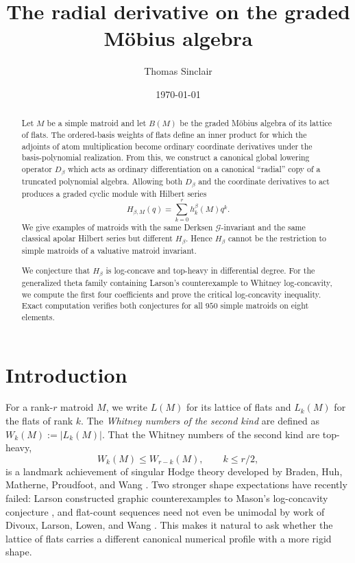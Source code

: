 \documentclass[11pt]{amsart}
\title[The radial derivative]{The radial derivative on the graded M\"obius algebra}
\author[T.~Sinclair]{Thomas Sinclair \orcidlink{0000-0003-0401-7232}}
\date{\today}
\theoremstyle{definition}
\theoremstyle{remark}
\begin{document}
\begin{abstract}
Let $M$ be a simple matroid and let $B(M)$ be the graded M\"obius algebra of its lattice of flats.  The ordered-basis weights of flats define an inner product for which the adjoints of atom multiplication become ordinary coordinate derivatives under the basis-polynomial realization. From this, we construct a canonical global lowering operator $D_\beta$ which acts as ordinary differentiation on a canonical ``radial'' copy of a truncated polynomial algebra.  Allowing both $D_\beta$ and the coordinate derivatives to act produces a graded cyclic module with Hilbert series
\[
H_{\beta,M}(q)=\sum_{k=0}^r h_k^\beta(M)q^k.
\]
We give examples of matroids with the same Derksen $\mathcal G$-invariant and the same classical apolar Hilbert series but different $H_\beta$.  Hence $H_\beta$ cannot be the restriction to simple matroids of a valuative matroid invariant.

We conjecture that $H_\beta$ is log-concave and top-heavy in differential degree.  For the generalized theta family containing Larson's counterexample to Whitney log-concavity, we compute the first four coefficients and prove the critical log-concavity inequality.  Exact computation verifies both conjectures for all $950$ simple matroids on eight elements.
\end{abstract}

\maketitle

\section{Introduction}

For a rank-$r$ matroid $M$, we write $L(M)$ for its lattice of flats and $L_k(M)$ for the flats of rank $k$. The \emph{Whitney numbers of the second kind} are defined as $W_k(M) := |L_k(M)|$.  That the Whitney numbers of the second kind are top-heavy,
\[
W_k(M)\le W_{r-k}(M),\qquad k\le r/2,
\]
is a landmark achievement of singular Hodge theory developed by Braden, Huh, Matherne, Proudfoot, and Wang \cite{BHMPW}.  Two stronger shape expectations have recently failed: Larson constructed graphic counterexamples to Mason's log-concavity conjecture \cites{Mason,Larson}, and flat-count sequences need not even be unimodal by work of Divoux, Larson, Lowen, and Wang \cite{DivouxLarsonLowenWang}.  This makes it natural to ask whether the lattice of flats carries a different canonical numerical profile with a more rigid shape.
\end{document}
